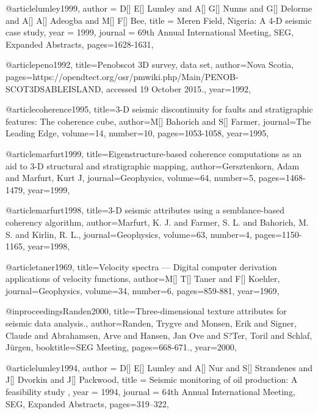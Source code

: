 @article{lumley1999,
  author =	 {D[] E[] Lumley and A[] G[] Nunns and G[] Delorme and A[] A[] Adeogba and M[] F[] Bee},
  title =	 {Meren Field, Nigeria: A 4-D seismic case study},
  year =	 1999,
  journal =	 {69th Annual International Meeting, SEG, Expanded Abstracts},
 pages=1628-1631,
}


@article{peno1992,
  title={Penobscot 3D survey, data set},
  author={Nova Scotia},
  pages={https://opendtect.org/osr/pmwiki.php/Main/PENOB- SCOT3DSABLEISLAND, accessed 19 October 2015.},
  year={1992},
}

@article{coherence1995,
  title={3-D seismic discontinuity for faults and stratigraphic features: The coherence cube},
  author={M[] Bahorich and S[] Farmer},
  journal={The Leading Edge},
  volume={14},
  number={10},
  pages={1053-1058},
  year={1995},
}

@article{marfurt1999,
  title={Eigenstructure-based coherence computations as an aid to 3-D structural and stratigraphic mapping},
  author={Gersztenkorn, Adam and Marfurt, Kurt J},
  journal={Geophysics},
  volume={64},
  number={5},
  pages={1468-1479},
  year={1999},
}

@article{marfurt1998,
  title={3-D seismic attributes using a semblance-based coherency algorithm},
  author={Marfurt, K. J. and Farmer, S. L. and Bahorich, M. S. and Kirlin, R. L.},
  journal={Geophysics},
  volume={63},
  number={4},
  pages={1150-1165},
  year={1998},
}

@article{taner1969,
  title={Velocity spectra — Digital computer derivation applications of velocity functions},
  author={M[] T[] Taner and F[] Koehler},
  journal={Geophysics},
  volume={34},
  number={6},
  pages={859-881},
  year={1969},
}

@inproceedings{Randen2000,
  title={Three-dimensional texture attributes for seismic data analysis.},
  author={Randen, Trygve and Monsen, Erik and Signer, Claude and Abrahamsen, Arve and Hansen, Jan Ove and S?Ter, Toril and Schlaf, Jürgen},
  booktitle={SEG Meeting},
  pages={668-671.},
  year={2000},
}








@article{lumley1994,
  author =	 {D[] E[] Lumley and A[] Nur and S[] Strandenes and J[] Dvorkin and J[] Packwood},
  title =	 {Seismic monitoring of oil production: A feasibility study
},
  year =	 1994,
  journal =	 {64th Annual International Meeting, SEG, Expanded Abstracts},
 pages=319–322,
}

